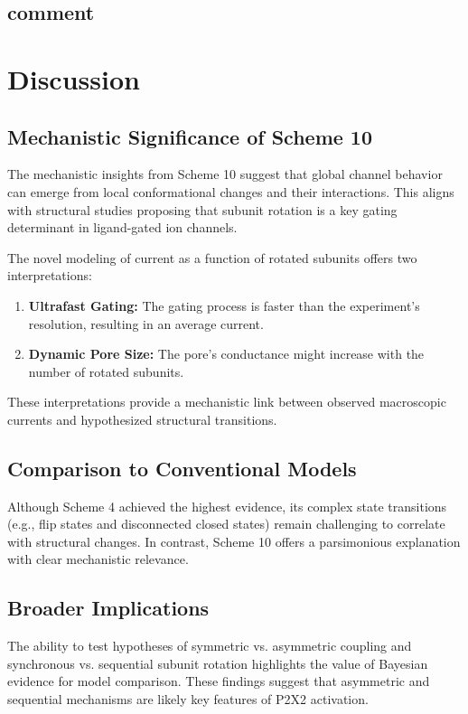 \documentclass[a4paper,12pt]{article}
\begin{document}
	\subsection{comment}
		
		\section{Discussion}\label{discussion}
		\subsection{Mechanistic Significance of Scheme 10}
		The mechanistic insights from Scheme 10 suggest that global channel behavior can emerge from local conformational changes and their interactions. This aligns with structural studies proposing that subunit rotation is a key gating determinant in ligand-gated ion channels.
		
		The novel modeling of current as a function of rotated subunits offers two interpretations:
		\begin{enumerate}
			\item \textbf{Ultrafast Gating:} The gating process is faster than the experiment’s resolution, resulting in an average current.
			\item \textbf{Dynamic Pore Size:} The pore’s conductance might increase with the number of rotated subunits.
		\end{enumerate}
		
		These interpretations provide a mechanistic link between observed macroscopic currents and hypothesized structural transitions.
		
		\subsection{Comparison to Conventional Models}
		Although Scheme 4 achieved the highest evidence, its complex state transitions (e.g., flip states and disconnected closed states) remain challenging to correlate with structural changes. In contrast, Scheme 10 offers a parsimonious explanation with clear mechanistic relevance.
		
		\subsection{Broader Implications}
		The ability to test hypotheses of symmetric vs. asymmetric coupling and synchronous vs. sequential subunit rotation highlights the value of Bayesian evidence for model comparison. These findings suggest that asymmetric and sequential mechanisms are likely key features of P2X2 activation.
		
\end{document}
